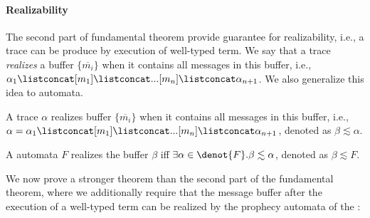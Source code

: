 \paragraph{Realizability} The second part of fundamental theorem provide guarantee for realizability, i.e., a trace can be produce by execution of well-typed term. We say that a trace \emph{realizes} a buffer $\{\overline{m_i}\}$ when
      it contains all messages in this buffer, i.e.,
      {\small$\alpha_1 \listconcat [m_1] \listconcat ... [m_{n}] \listconcat
      \alpha_{n+1}$}. We also generalize this idea to automata.

\newcommand{\realz}{\lesssim}

\begin{definition}\label{def:tr-buffer} A trace $\alpha$ realizes buffer $\{\overline{m_i}\}$ when it contains all messages in this buffer, i.e., 
{\small$\alpha = \alpha_1 \listconcat [m_1] \listconcat ... [m_{n}] \listconcat \alpha_{n+1}$}, denoted as $\beta \realz \alpha$. 
\end{definition}

\begin{definition}\label{def:a-buffer} A automata $F$ realizes the buffer $\beta$ iff $\exists \alpha \in \denot{F}. \beta \realz \alpha$, denoted as $\beta \realz F$.
\end{definition}

We now prove a stronger theorem than the second part of the fundamental theorem, where we additionally require that the message buffer after the execution of a well-typed term can be realized by the prophecy automata of the \PAT{}:

